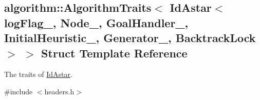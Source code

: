 \hypertarget{structalgorithm_1_1AlgorithmTraits_3_01IdAstar_3_01logFlag___00_01Node___00_01GoalHandler___00_0bcfa8cd23975927c1263342162c05b23}{}\subsection{algorithm\+:\+:Algorithm\+Traits$<$ Id\+Astar$<$ log\+Flag\+\_\+, Node\+\_\+, Goal\+Handler\+\_\+, Initial\+Heuristic\+\_\+, Generator\+\_\+, Backtrack\+Lock $>$ $>$ Struct Template Reference}
\label{structalgorithm_1_1AlgorithmTraits_3_01IdAstar_3_01logFlag___00_01Node___00_01GoalHandler___00_0bcfa8cd23975927c1263342162c05b23}


The traits of \hyperlink{structIdAstar}{Id\+Astar}.  




{\ttfamily \#include $<$headers.\+h$>$}

